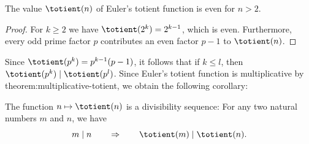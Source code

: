 \begin{corollary}
  The value $\totient(n)$ of Euler's totient function is even for $n>2$.
\end{corollary}

\begin{proof}
  For $k\geq 2$ we have $\totient(2^k)=2^{k-1}$, which is even. Furthermore, every odd prime factor $p$ contributes an even factor $p-1$ to $\totient(n)$.
\end{proof}

Since $\totient(p^k)=p^{k-1}(p-1)$, it follows that if $k\leq l$, then $\totient(p^k)\mid \totient(p^l)$. Since Euler's totient function is multiplicative by {theorem:multiplicative-totient}, we obtain the following corollary:

\begin{corollary}
  The function $n\mapsto\totient(n)$ is a divisibility sequence: For any two natural numbers $m$ and $n$, we have
  \begin{equation*}
    m\mid n\qquad\Rightarrow\qquad \totient(m)\mid\totient(n).
  \end{equation*}
\end{corollary}


